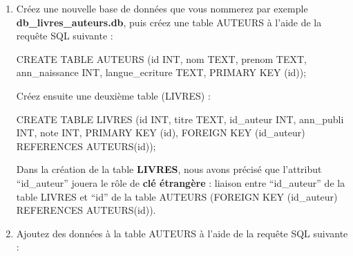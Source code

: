 \documentclass[
  a4paper,
  DIV=11,
  numbers=noendperiod]{scrartcl}
\newenvironment{Shaded}{\begin{snugshade}}{\end{snugshade}}
\newcommand{\DataTypeTok}[1]{\textcolor[rgb]{0.68,0.00,0.00}{#1}}
\newcommand{\KeywordTok}[1]{\textcolor[rgb]{0.00,0.23,0.31}{#1}}
\newcommand{\NormalTok}[1]{\textcolor[rgb]{0.00,0.23,0.31}{#1}}
\begin{document}
\begin{enumerate}
\def\labelenumi{\arabic{enumi}.}
\item
  Créez une nouvelle base de données que vous nommerez par exemple
  \textbf{db\_livres\_auteurs.db}, puis créez une table AUTEURS à l'aide
  de la requête SQL suivante :

\begin{Shaded}
\begin{Highlighting}[]
\KeywordTok{CREATE} \KeywordTok{TABLE}\NormalTok{ AUTEURS}
\NormalTok{(}\KeywordTok{id} \DataTypeTok{INT}\NormalTok{, nom TEXT, prenom TEXT, ann\_naissance }\DataTypeTok{INT}\NormalTok{, langue\_ecriture TEXT, }\KeywordTok{PRIMARY} \KeywordTok{KEY}\NormalTok{ (}\KeywordTok{id}\NormalTok{));}
\end{Highlighting}
\end{Shaded}

  Créez ensuite une deuxième table (LIVRES) :

\begin{Shaded}
\begin{Highlighting}[]
\KeywordTok{CREATE} \KeywordTok{TABLE}\NormalTok{ LIVRES}
\NormalTok{(}\KeywordTok{id} \DataTypeTok{INT}\NormalTok{, titre TEXT, id\_auteur }\DataTypeTok{INT}\NormalTok{, ann\_publi }\DataTypeTok{INT}\NormalTok{, note }\DataTypeTok{INT}\NormalTok{, }\KeywordTok{PRIMARY} \KeywordTok{KEY}\NormalTok{ (}\KeywordTok{id}\NormalTok{), }\KeywordTok{FOREIGN} \KeywordTok{KEY}\NormalTok{ (id\_auteur) }\KeywordTok{REFERENCES}\NormalTok{ AUTEURS(}\KeywordTok{id}\NormalTok{));}
\end{Highlighting}
\end{Shaded}

  Dans la création de la table \textbf{LIVRES}, nous avons précisé que
  l'attribut ``id\_auteur'' jouera le rôle de \textbf{clé étrangère} :
  liaison entre ``id\_auteur'' de la table LIVRES et ``id'' de la table
  AUTEURS (FOREIGN KEY (id\_auteur) REFERENCES AUTEURS(id)).
\item
  Ajoutez des données à la table AUTEURS à l'aide de la requête SQL
  suivante :


\end{enumerate}
\end{document}
